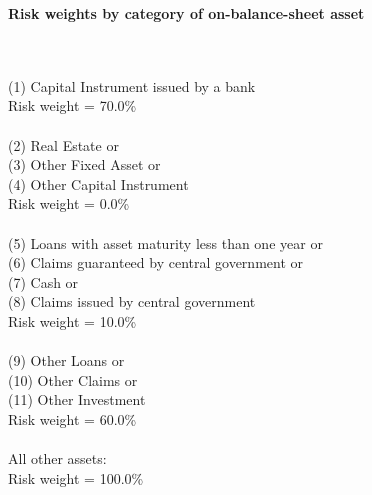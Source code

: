 \documentclass{article}
\begin{document}
\setlength{\parindent}{0em}
\begin{center}{\bf Risk weights by category of on-balance-sheet asset}\end{center}
~\\
~\\

(1) Capital Instrument issued by a bank \\
Risk weight = 70.0\%\\

~\\
(2) Real Estate or \\
(3) Other Fixed Asset or \\
(4) Other Capital Instrument\\
Risk weight = 0.0\%\\

~\\
(5) Loans with asset maturity less than one year or \\
(6) Claims guaranteed by central government or \\
(7) Cash or\\
(8) Claims issued by central government \\
Risk weight = 10.0\%\\

~\\
(9) Other Loans or \\
(10) Other Claims or \\
(11) Other Investment \\
Risk weight = 60.0\%\\

~\\
All other assets:\\
Risk weight = 100.0\%\\

~\\
\end{document}
